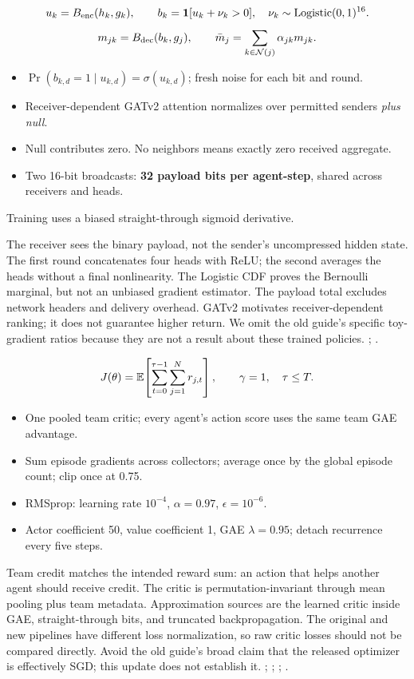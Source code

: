 {\[
u_k=B_{\rm enc}(h_k,g_k),\qquad b_k=\mathbf1[u_k+\nu_k>0],\quad \nu_k\sim\mathrm{Logistic}(0,1)^{16}.
\]
\[
m_{jk}=B_{\rm dec}(b_k,g_j),\qquad
\bar m_j=\sum_{k\in\mathcal N(j)}\alpha_{jk}m_{jk}.
\]
\begin{itemize}
\item $\Pr(b_{k,d}=1\mid u_{k,d})=\sigma(u_{k,d})$; fresh noise for each bit and round.
\item Receiver-dependent GATv2 attention normalizes over permitted senders \emph{plus null}.
\item Null contributes zero. No neighbors means exactly zero received aggregate.
\item Two 16-bit broadcasts: \textbf{32 payload bits per agent-step}, shared across receivers and heads.
\end{itemize}
\small Training uses a biased straight-through sigmoid derivative.}
{The receiver sees the binary payload, not the sender's uncompressed hidden state. The first round concatenates four heads with ReLU; the second averages the heads without a final nonlinearity. The Logistic CDF proves the Bernoulli marginal, but not an unbiased gradient estimator. The payload total excludes network headers and delivery overhead. GATv2 motivates receiver-dependent ranking; it does not guarantee higher return. We omit the old guide's specific toy-gradient ratios because they are not a result about these trained policies.}
{; .}

{\[
J(\theta)=\mathbb{E}\!\left[\sum_{t=0}^{\tau-1}\sum_{j=1}^{N}r_{j,t}\right],\qquad \gamma=1,\quad\tau\le T.
\]
\begin{itemize}
\item One pooled team critic; every agent's action score uses the same team GAE advantage.
\item Sum episode gradients across collectors; average once by the global episode count; clip once at 0.75.
\item RMSprop: learning rate $10^{-4}$, $\alpha=0.97$, $\epsilon=10^{-6}$.
\item Actor coefficient 50, value coefficient 1, GAE $\lambda=0.95$; detach recurrence every five steps.
\end{itemize}
}
{Team credit matches the intended reward sum: an action that helps another agent should receive credit. The critic is permutation-invariant through mean pooling plus team metadata. Approximation sources are the learned critic inside GAE, straight-through bits, and truncated backpropagation. The original and new pipelines have different loss normalization, so raw critic losses should not be compared directly. Avoid the old guide's broad claim that the released optimizer is effectively SGD; this update does not establish it.}
{; ; ; .}

